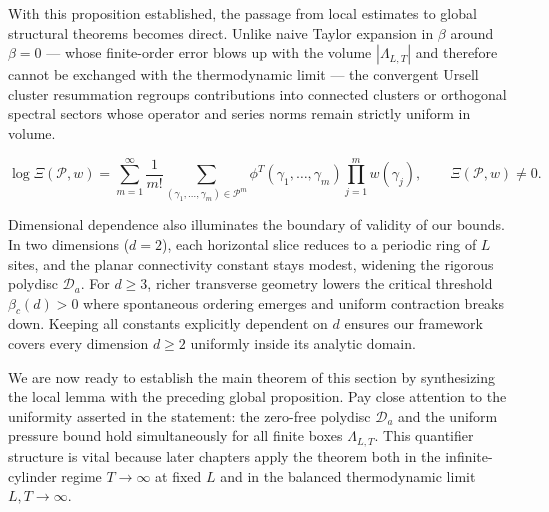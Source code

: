 \documentclass[11pt]{article}
\theoremstyle{definition}
\begin{document}
With this proposition established, the passage from local estimates to global
structural theorems becomes direct. Unlike naive Taylor expansion in $\beta$ around
$\beta = 0$ --- whose finite-order error blows up with the volume $|\Lambda_{L,T}|$
and therefore cannot be exchanged with the thermodynamic limit --- the convergent
Ursell cluster resummation regroups contributions into connected clusters or
orthogonal spectral sectors whose operator and series norms remain strictly uniform
in volume.

\[
  \log \Xi(\mathcal{P}, w) = \sum_{m=1}^{\infty} \frac{1}{m!} \sum_{(\gamma_1, \dots, \gamma_m) \in \mathcal{P}^m} \phi^T(\gamma_1, \dots, \gamma_m) \prod_{j=1}^m w(\gamma_j), \qquad \Xi(\mathcal{P}, w) \neq 0.
\]

Dimensional dependence also illuminates the boundary of validity of our bounds. In
two dimensions ($d = 2$), each horizontal slice reduces to a periodic ring of $L$
sites, and the planar connectivity constant stays modest, widening the rigorous
polydisc $\mathcal{D}_a$. For $d \ge 3$, richer transverse geometry lowers the
critical threshold $\beta_c(d) > 0$ where spontaneous ordering emerges and uniform
contraction breaks down. Keeping all constants explicitly dependent on $d$ ensures
our framework covers every dimension $d \ge 2$ uniformly inside its analytic domain.

We are now ready to establish the main theorem of this section by synthesizing the
local lemma with the preceding global proposition. Pay close attention to the
uniformity asserted in the statement: the zero-free polydisc $\mathcal{D}_a$ and the
uniform pressure bound hold simultaneously for all finite boxes $\Lambda_{L,T}$.
This quantifier structure is vital because later chapters apply the theorem both in
the infinite-cylinder regime $T \to \infty$ at fixed $L$ and in the balanced
thermodynamic limit $L, T \to \infty$.
\end{document}
